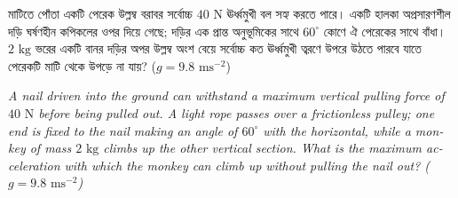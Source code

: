 \documentclass[12pt, a4paper]{article}
\begin{document}
\begin{tcolorbox}[questionbox={প্রশ্ন (Question) 19}]
    \noindent
    মাটিতে পোঁতা একটি পেরেক উল্লম্ব বরাবর সর্বোচ্চ $40\text{ N}$ ঊর্ধ্বমুখী বল সহ্য করতে পারে। একটি হালকা অপ্রসারণশীল দড়ি ঘর্ষণহীন কপিকলের ওপর দিয়ে গেছে; দড়ির এক প্রান্ত অনুভূমিকের সাথে $60^\circ$ কোণে ঐ পেরেকের সাথে বাঁধা। $2\text{ kg}$ ভরের একটি বানর দড়ির অপর উল্লম্ব অংশ বেয়ে সর্বোচ্চ কত ঊর্ধ্বমুখী ত্বরণে উপরে উঠতে পারবে যাতে পেরেকটি মাটি থেকে উপড়ে না যায়? ($g = 9.8\text{ ms}^{-2}$)
    
    \vspace{0.8em}
    \begin{english}
    \noindent\textit{\color{darkgray}
    A nail driven into the ground can withstand a maximum vertical pulling force of $40\text{ N}$ before being pulled out. A light rope passes over a frictionless pulley; one end is fixed to the nail making an angle of $60^\circ$ with the horizontal, while a monkey of mass $2\text{ kg}$ climbs up the other vertical section. What is the maximum acceleration with which the monkey can climb up without pulling the nail out? ($g = 9.8\text{ ms}^{-2}$)
    }
    \end{english}
\end{tcolorbox}
\end{document}
